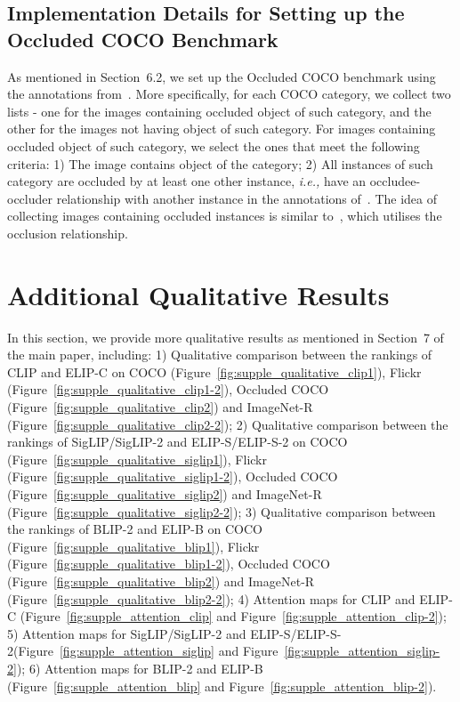\subsection{Implementation Details for Setting up the Occluded COCO Benchmark}
\label{sec:sup_implement_detail_occluded}

As mentioned in Section~6.2, we set up the Occluded COCO benchmark using the annotations from~\cite{lee2022instance}. More specifically, for each COCO category, we collect two lists - one for the images containing occluded object of such category, and the other for the images not having object of such category.
For images containing occluded object of such category, 
we select the ones that meet the following criteria: 
1) The image contains object of the category; 2) All instances of such category are occluded by at least one other instance, \emph{i.e.,} have an occludee-occluder relationship with another instance in the annotations of~\cite{lee2022instance}. The idea of collecting images containing occluded instances is similar to~\cite{zhan2022tri}, which utilises the occlusion relationship. 






\clearpage
\section{Additional Qualitative Results}
\label{sec:sup_qualitative}

In this section, we provide more qualitative results as mentioned in Section~7 of the main paper, including: 
1) Qualitative comparison between the rankings of CLIP and ELIP-C on COCO (Figure~\ref{fig:supple_qualitative_clip1}), Flickr (Figure~\ref{fig:supple_qualitative_clip1-2}), Occluded COCO (Figure~\ref{fig:supple_qualitative_clip2}) and ImageNet-R (Figure~\ref{fig:supple_qualitative_clip2-2}); 
2) Qualitative comparison between the rankings of SigLIP/SigLIP-2 and ELIP-S/ELIP-S-2 on COCO (Figure~\ref{fig:supple_qualitative_siglip1}), Flickr (Figure~\ref{fig:supple_qualitative_siglip1-2}), Occluded COCO (Figure~\ref{fig:supple_qualitative_siglip2}) and ImageNet-R (Figure~\ref{fig:supple_qualitative_siglip2-2}); 
3) Qualitative comparison between the rankings of BLIP-2 and ELIP-B on COCO (Figure~\ref{fig:supple_qualitative_blip1}), Flickr (Figure~\ref{fig:supple_qualitative_blip1-2}), Occluded COCO (Figure~\ref{fig:supple_qualitative_blip2}) and ImageNet-R (Figure~\ref{fig:supple_qualitative_blip2-2}); 
4) Attention maps for CLIP and ELIP-C (Figure~\ref{fig:supple_attention_clip} and Figure~\ref{fig:supple_attention_clip-2}); 
5) Attention maps for SigLIP/SigLIP-2 and ELIP-S/ELIP-S-2(Figure~\ref{fig:supple_attention_siglip} and Figure~\ref{fig:supple_attention_siglip-2}); 
6) Attention maps for BLIP-2 and ELIP-B (Figure~\ref{fig:supple_attention_blip} and Figure~\ref{fig:supple_attention_blip-2}).


